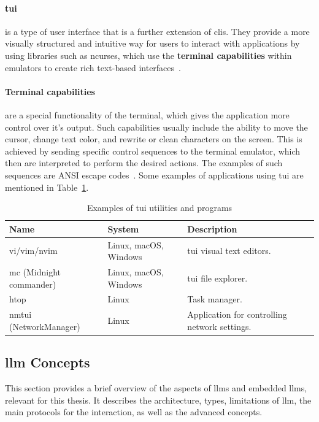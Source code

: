 \paragraph{\gls{tui}}
is a type of user interface that is a further extension of \glspl{cli}. They
provide a more visually structured and intuitive way for users to interact with
applications by using libraries such as ncurses, which use the \textbf{terminal
capabilities} within emulators to create rich text-based
interfaces~\cite{linfo_terminal}.

\paragraph{Terminal capabilities}
are a special functionality of the terminal, which gives the application more
control over it's output. Such capabilities usually include the ability to move
the cursor, change text color, and rewrite or clean characters on the screen.
This is achieved by sending specific control sequences to the terminal emulator,
which then are interpreted to perform the desired actions. The examples of such
sequences are ANSI escape codes~\cite{terminfo,iso6429}. Some examples of
applications using \gls{tui} are mentioned in Table~\ref{t:utils2}.

\begin{table}
  \caption{Examples of \gls{tui} utilities and programs}\label{t:utils2}
    \begin{tabularx}{\textwidth}{lXX}
    \toprule
    Name & System & Description \\
    \midrule
    vi/vim/nvim
    & Linux, macOS, Windows
    & \gls{tui} visual
    text editors. \\
    mc (Midnight commander)
    & Linux, macOS, Windows
    & \gls{tui} file explorer.\\
    htop
    & Linux
    & Task manager.\\
    nmtui (NetworkManager)
    & Linux
    & Application for controlling network settings. \\
    \bottomrule
  \end{tabularx}
\end{table}


\subsection{\gls{llm} Concepts}

This section provides a brief overview of the aspects of \glspl{llm} and
embedded \glspl{llm}, relevant for this thesis. It describes the architecture,
types, limitations of \gls{llm}, the main protocols for the interaction, as well
as the advanced concepts.

